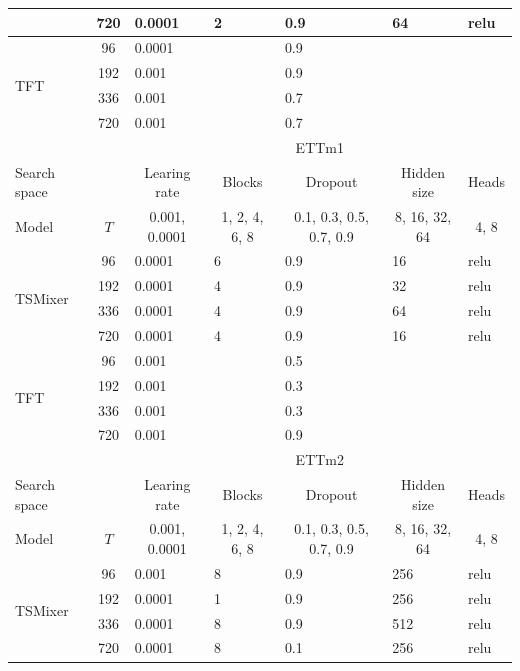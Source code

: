 \begin{longtable}{l|c|lllll}
 & 720 & 0.0001 & 2 & 0.9 & 64 & relu \\ \hline
\multirow{4}{*}{TFT} & 96 & 0.0001 &  & 0.9 &  &  \\
 & 192 & 0.001 &  & 0.9 &  &  \\
 & 336 & 0.001 &  & 0.7 &  &  \\
 & 720 & 0.001 &  & 0.7 &  &  \\ \hline
 & \multicolumn{1}{l|}{} & \multicolumn{5}{c}{ETTm1} \\ \hline
Search space & \multicolumn{1}{l|}{} & \multicolumn{1}{c}{Learing rate} & \multicolumn{1}{c}{Blocks} & \multicolumn{1}{c}{Dropout} & \multicolumn{1}{c}{Hidden size} & \multicolumn{1}{c}{Heads} \\ \hline
Model & $T$ & \multicolumn{1}{c}{0.001, 0.0001} & \multicolumn{1}{c}{1, 2, 4, 6, 8} & \multicolumn{1}{c}{0.1, 0.3, 0.5, 0.7, 0.9} & \multicolumn{1}{c}{8, 16, 32, 64} & \multicolumn{1}{c}{4, 8} \\ \hline
\multirow{4}{*}{TSMixer} & 96 & 0.0001 & 6 & 0.9 & 16 & relu \\
 & 192 & 0.0001 & 4 & 0.9 & 32 & relu \\
 & 336 & 0.0001 & 4 & 0.9 & 64 & relu \\
 & 720 & 0.0001 & 4 & 0.9 & 16 & relu \\ \hline
\multirow{4}{*}{TFT} & 96 & 0.001 &  & 0.5 &  &  \\
 & 192 & 0.001 &  & 0.3 &  &  \\
 & 336 & 0.001 &  & 0.3 &  &  \\
 & 720 & 0.001 &  & 0.9 &  &  \\ \hline
 & \multicolumn{1}{l|}{} & \multicolumn{5}{c}{ETTm2} \\ \hline
Search space & \multicolumn{1}{l|}{} & \multicolumn{1}{c}{Learing rate} & \multicolumn{1}{c}{Blocks} & \multicolumn{1}{c}{Dropout} & \multicolumn{1}{c}{Hidden size} & \multicolumn{1}{c}{Heads} \\ \hline
Model & $T$ & \multicolumn{1}{c}{0.001, 0.0001} & \multicolumn{1}{c}{1, 2, 4, 6, 8} & \multicolumn{1}{c}{0.1, 0.3, 0.5, 0.7, 0.9} & \multicolumn{1}{c}{8, 16, 32, 64} & \multicolumn{1}{c}{4, 8} \\ \hline
\multirow{4}{*}{TSMixer} & 96 & 0.001 & 8 & 0.9 & 256 & relu \\
 & 192 & 0.0001 & 1 & 0.9 & 256 & relu \\
 & 336 & 0.0001 & 8 & 0.9 & 512 & relu \\
 & 720 & 0.0001 & 8 & 0.1 & 256 & relu \\ \hline

\end{longtable}
